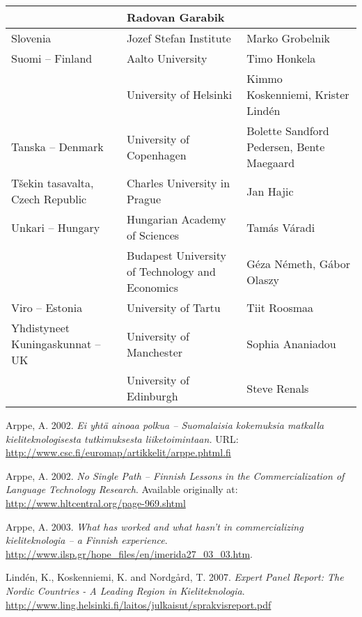 \documentclass{../../metanetpaper}
\begin{document}
\begin{Parallel}[c]{79mm}{78mm}
\begin{longtable}{p{3.5cm}|p{5.5cm}|p{5cm}}
 &  Radovan Garabik
 \\ \hline
 Slovenia
 &  Jozef Stefan Institute
 &  Marko Grobelnik
 \\ \hline
 Suomi -- Finland
 & Aalto University
 & Timo Honkela
 \\
 & University of Helsinki
 & Kimmo Koskenniemi,
   Krister Lindén
 \\ \hline
 Tanska -- Denmark
 &  University of Copenhagen
 &  Bolette Sandford Pedersen,
    Bente Maegaard
 \\ \hline
 \raggedright
 Tšekin tasavalta, Czech Republic
 &  Charles University in Prague
 &  Jan Hajic
 \\ \hline
 Unkari -- Hungary
 &  Hungarian Academy of Sciences
 &  Tamás Váradi
 \\
 &  \raggedright Budapest University of            
    Technology and Economics
 &  Géza Németh,
    Gábor Olaszy
 \\ \hline
 Viro -- Estonia
 &  University of Tartu
 &  Tiit Roosmaa \\ \hline
 Yhdistyneet
 Kuningaskunnat -- UK
 &  University of Manchester
 &  Sophia Ananiadou \\
 &  University of Edinburgh
 &  Steve Renals
 \\ \hline
\end{longtable}



%
%  
%  
\begin{thebibliography}{102}\raggedright
{}
Arppe, A. 2002.
\emph{Ei yhtä ainoaa polkua -- Suomalaisia kokemuksia matkalla
      kieliteknologisesta tutkimuksesta liiketoimintaan.}
URL:
\url{http://www.csc.fi/euromap/artikkelit/arppe.phtml.fi}

Arppe, A. 2002.
\emph{No Single Path -- Finnish Lessons in the Commercialization of
      Language Technology Research}.
Available originally at:
\url{http://www.hltcentral.org/page-969.shtml}

Arppe, A. 2003.
\emph{What has worked and what hasn't in commercializing kieliteknologia --
      a Finnish experience}.
\url{http://www.ilsp.gr/hope_files/en/imerida27_03_03.htm}.

Lindén, K., Koskenniemi, K. and Nordgård, T. 2007.
\emph{Expert Panel Report: The
Nordic Countries - A Leading Region in Kieliteknologia}.
\url{http://www.ling.helsinki.fi/laitos/julkaisut/sprakvisreport.pdf}


\end{thebibliography}
\end{Parallel}
\end{document}
